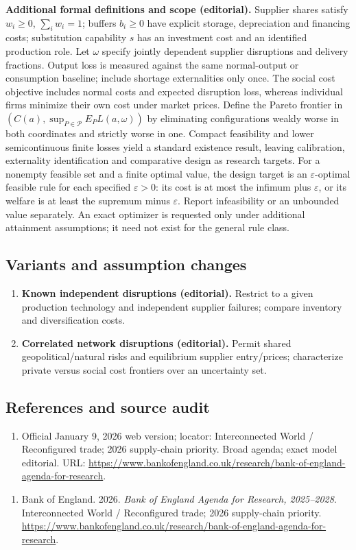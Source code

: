 \documentclass[11pt,a4paper]{article}
\begin{document}
\textbf{Additional formal definitions and scope (editorial).} Supplier shares satisfy \(w_i\geq0\), \(\sum_iw_i=1\); buffers \(b_i\geq0\) have explicit storage, depreciation and financing costs; substitution capability \(s\) has an investment cost and an identified production role. Let \(\omega\) specify jointly dependent supplier disruptions and delivery fractions. Output loss is measured against the same normal-output or consumption baseline; include shortage externalities only once. The social cost objective includes normal costs and expected disruption loss, whereas individual firms minimize their own cost under market prices. Define the Pareto frontier in \((C(a),\sup_{P\in\mathcal P}E_PL(a,\omega))\) by eliminating configurations weakly worse in both coordinates and strictly worse in one. Compact feasibility and lower semicontinuous finite losses yield a standard existence result, leaving calibration, externality identification and comparative design as research targets. For a nonempty feasible set and a finite optimal value, the design target is an \(\varepsilon\)-optimal feasible rule for each specified \(\varepsilon>0\): its cost is at most the infimum plus \(\varepsilon\), or its welfare is at least the supremum minus \(\varepsilon\). Report infeasibility or an unbounded value separately. An exact optimizer is requested only under additional attainment assumptions; it need not exist for the general rule class.
\subsection*{Variants and assumption changes}
\begin{enumerate}
\item \textbf{Known independent disruptions (editorial).} Restrict to a given production technology and independent supplier failures; compare inventory and diversification costs.
\item \textbf{Correlated network disruptions (editorial).} Permit shared geopolitical/natural risks and equilibrium supplier entry/prices; characterize private versus social cost frontiers over an uncertainty set.
\end{enumerate}
\subsection*{References and source audit}
\begin{enumerate}
\item Official January 9, 2026 web version; locator: Interconnected World / Reconfigured trade; 2026 supply-chain priority. Broad agenda; exact model editorial. URL: \url{https://www.bankofengland.co.uk/research/bank-of-england-agenda-for-research}.
\end{enumerate}
\begin{enumerate}\raggedright
\item\hypertarget{definitions:source:30007627:1}{} Bank of England. 2026. \emph{Bank of England Agenda for Research, 2025–2028}. Interconnected World / Reconfigured trade; 2026 supply-chain priority.
\url{https://www.bankofengland.co.uk/research/bank-of-england-agenda-for-research}.
\end{enumerate}
\end{document}
